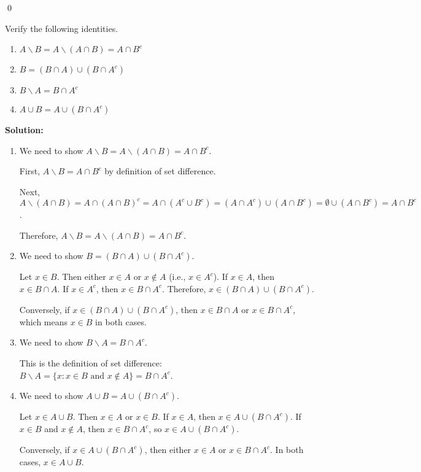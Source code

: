 \qed
\begin{problembox}
Verify the following identities.
\begin{enumerate}[label=(\alph*)]
    \item $A \backslash B = A \backslash (A \cap B) = A \cap B^c$
    \item $B = (B \cap A) \cup (B \cap A^c)$
    \item $B \backslash A = B \cap A^c$
    \item $A \cup B = A \cup (B \cap A^c)$
\end{enumerate}

\end{problembox}

\noindent\textbf{Solution:}
\begin{enumerate}[label=(\alph*)]
    \item We need to show $A \backslash B = A \backslash (A \cap B) = A \cap B^c$.
    
    First, $A \backslash B = A \cap B^c$ by definition of set difference.
    
    Next, $A \backslash (A \cap B) = A \cap (A \cap B)^c = A \cap (A^c \cup B^c) = (A \cap A^c) \cup (A \cap B^c) = \emptyset \cup (A \cap B^c) = A \cap B^c$.
    
    Therefore, $A \backslash B = A \backslash (A \cap B) = A \cap B^c$.
    
    \item We need to show $B = (B \cap A) \cup (B \cap A^c)$.
    
    Let $x \in B$. Then either $x \in A$ or $x \notin A$ (i.e., $x \in A^c$). If $x \in A$, then $x \in B \cap A$. If $x \in A^c$, then $x \in B \cap A^c$. Therefore, $x \in (B \cap A) \cup (B \cap A^c)$.
    
    Conversely, if $x \in (B \cap A) \cup (B \cap A^c)$, then $x \in B \cap A$ or $x \in B \cap A^c$, which means $x \in B$ in both cases.
    
    \item We need to show $B \backslash A = B \cap A^c$.
    
    This is the definition of set difference: $B \backslash A = \{x : x \in B \text{ and } x \notin A\} = B \cap A^c$.
    
    \item We need to show $A \cup B = A \cup (B \cap A^c)$.
    
    Let $x \in A \cup B$. Then $x \in A$ or $x \in B$. If $x \in A$, then $x \in A \cup (B \cap A^c)$. If $x \in B$ and $x \notin A$, then $x \in B \cap A^c$, so $x \in A \cup (B \cap A^c)$.
    
    Conversely, if $x \in A \cup (B \cap A^c)$, then either $x \in A$ or $x \in B \cap A^c$. In both cases, $x \in A \cup B$.
\end{enumerate}



